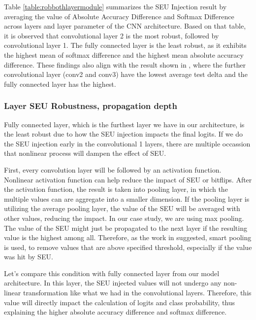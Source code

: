 \documentclass[ %
                    author={Revalda Putawara},
                supervisor={Dr. James Pope},
                    degree={MSc},
                     title={Robustness of Bayesian Neural Networks Design Choices Against Weight and Bias Perturbation Induced by Single Event Upsets (SEUs)},
                      type={},
                      year={2025}]{dissertation}
\begin{document}
Table \ref{table:robbothlayermodule} summarizes the SEU Injection result by averaging the value of Absolute Accuracy Difference and Softmax Difference across layers and layer parameter of the CNN architecture. Based on that table, it is observed that convolutional layer 2 is the most robust, followed by convolutional layer 1. The fully connected layer is the least robust, as it exhibits the highest mean of softmax difference and the highest mean absolute accuracy difference. These findings also align with the result shown in \cite{dennispoperobustcnn}, where the further convolutional layer (conv2 and conv3) have the lowest average test delta and the fully connected layer has the highest.

\subsubsection {Layer SEU Robustness, propagation depth}


Fully connected layer, which is the furthest layer we have in our architecture, is the least robust due to how the SEU injection impacts the final logits. If we do the SEU injection early in the convolutional 1 layers, there are multiple occassion that nonlinear process will dampen the effect of SEU. 

First, every convolution layer will be followed by an activation function. Nonlinear activation function can help reduce the impact of SEU or bitflips. After the activation function, the result is taken into pooling layer, in which the multiple values can are aggregate into a smaller dimension. If the pooling layer is utilizing the average pooling layer, the value of the SEU will be averaged with other values, reducing the impact. In our case study, we are using max pooling. The value of the SEU might just be propagated to the next layer if the resulting value is the highest among all. Therefore, as the work in \cite{dennispoperobustcnn} suggested, smart pooling is used, to remove values that are above specified threshold, especially if the value was hit by SEU.

Let's compare this condition with fully connected layer from our model architecture. In this layer, the SEU injected values will not undergo any non-linear transformation like what we had in the convolutional layers. Therefore, this value will directly impact the calculation of logits and class probability, thus explaining the higher absolute accuracy difference and softmax difference.
\end{document}
